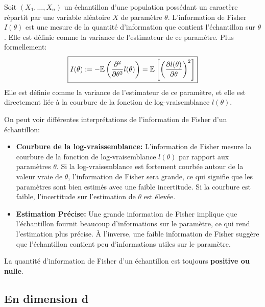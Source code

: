 \newpage 

\begin{definition}
    Soit $(X_1, \dots, X_n)$ un échantillon d'une population possédant un caractère répartit par une variable aléatoire $X$ 
    de paramètre $\theta$. L'information de Fisher $I(\theta)$ est une mesure de la quantité d'information que contient 
    l'échantillon sur $\theta$. Elle est définie comme la variance de l'estimateur de ce paramètre. 
    Plus formellement: 
        \[ \boxed{ I(\theta) := - \mathbb{E} \left( \frac{\partial^2}{\partial \theta^2} l(\theta) \right) = \mathbb{E} \left[ \left( \frac{\partial l(\theta)}{\partial \theta}\right) ^2 \right] } \] 
    Elle est définie comme la variance de l'estimateur de ce paramètre, et elle est directement liée 
    à la courbure de la fonction de log-vraisemblance $l(\theta)$. 
\end{definition}

\begin{remark}[Interprétation]
    On peut voir différentes interprétations de l'information de Fisher d'un échantillon: 
    \begin{itemize}
        \item \textbf{Courbure de la log-vraissemblance: } L'information de Fisher mesure la courbure de la 
        fonction de log-vraisemblance $l(\theta)$ par rapport aux paramètres $\theta$. 
        Si la log-vraisemblance est fortement courbée autour de la valeur vraie de $\theta$, 
        l'information de Fisher sera grande, ce qui signifie que les paramètres sont bien estimés avec une faible incertitude. 
        Si la courbure est faible, l'incertitude sur l'estimation de $\theta$ est élevée.
        \item \textbf{Estimation Précise: } Une grande information de Fisher implique que l'échantillon 
        fournit beaucoup d'informations sur le paramètre, ce qui rend l'estimation plus précise. 
        À l'inverse, une faible information de Fisher suggère que l'échantillon contient peu d'informations 
        utiles sur le paramètre.
    \end{itemize}
\end{remark}

\begin{prop}
    La quantité d'information de Fisher d'un échantillon est toujours \textbf{positive ou nulle}. 
\end{prop}

\subsection{En dimension d}

